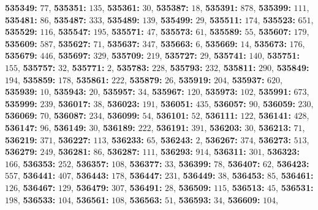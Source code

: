 \textsf{\bfseries 535349:} $77$, \textsf{\bfseries 535351:} $135$, \textsf{\bfseries 535361:} $30$, \textsf{\bfseries 535387:} $18$, \textsf{\bfseries 535391:} $878$, \textsf{\bfseries 535399:} $111$, \textsf{\bfseries 535481:} $86$, \textsf{\bfseries 535487:} $333$, \textsf{\bfseries 535489:} $139$, \textsf{\bfseries 535499:} $29$, \textsf{\bfseries 535511:} $174$, \textsf{\bfseries 535523:} $651$, \textsf{\bfseries 535529:} $116$, \textsf{\bfseries 535547:} $195$, \textsf{\bfseries 535571:} $47$, \textsf{\bfseries 535573:} $61$, \textsf{\bfseries 535589:} $55$, \textsf{\bfseries 535607:} $179$, \textsf{\bfseries 535609:} $587$, \textsf{\bfseries 535627:} $71$, \textsf{\bfseries 535637:} $347$, \textsf{\bfseries 535663:} $6$, \textsf{\bfseries 535669:} $14$, \textsf{\bfseries 535673:} $176$, \textsf{\bfseries 535679:} $446$, \textsf{\bfseries 535697:} $329$, \textsf{\bfseries 535709:} $219$, \textsf{\bfseries 535727:} $29$, \textsf{\bfseries 535741:} $140$, \textsf{\bfseries 535751:} $155$, \textsf{\bfseries 535757:} $32$, \textsf{\bfseries 535771:} $2$, \textsf{\bfseries 535783:} $228$, \textsf{\bfseries 535793:} $232$, \textsf{\bfseries 535811:} $290$, \textsf{\bfseries 535849:} $194$, \textsf{\bfseries 535859:} $178$, \textsf{\bfseries 535861:} $222$, \textsf{\bfseries 535879:} $26$, \textsf{\bfseries 535919:} $204$, \textsf{\bfseries 535937:} $620$, \textsf{\bfseries 535939:} $10$, \textsf{\bfseries 535943:} $20$, \textsf{\bfseries 535957:} $34$, \textsf{\bfseries 535967:} $120$, \textsf{\bfseries 535973:} $102$, \textsf{\bfseries 535991:} $673$, \textsf{\bfseries 535999:} $239$, \textsf{\bfseries 536017:} $38$, \textsf{\bfseries 536023:} $191$, \textsf{\bfseries 536051:} $435$, \textsf{\bfseries 536057:} $90$, \textsf{\bfseries 536059:} $230$, \textsf{\bfseries 536069:} $70$, \textsf{\bfseries 536087:} $234$, \textsf{\bfseries 536099:} $54$, \textsf{\bfseries 536101:} $52$, \textsf{\bfseries 536111:} $122$, \textsf{\bfseries 536141:} $428$, \textsf{\bfseries 536147:} $96$, \textsf{\bfseries 536149:} $30$, \textsf{\bfseries 536189:} $222$, \textsf{\bfseries 536191:} $391$, \textsf{\bfseries 536203:} $30$, \textsf{\bfseries 536213:} $71$, \textsf{\bfseries 536219:} $371$, \textsf{\bfseries 536227:} $113$, \textsf{\bfseries 536233:} $65$, \textsf{\bfseries 536243:} $2$, \textsf{\bfseries 536267:} $374$, \textsf{\bfseries 536273:} $513$, \textsf{\bfseries 536279:} $249$, \textsf{\bfseries 536281:} $86$, \textsf{\bfseries 536287:} $111$, \textsf{\bfseries 536293:} $914$, \textsf{\bfseries 536311:} $301$, \textsf{\bfseries 536323:} $166$, \textsf{\bfseries 536353:} $252$, \textsf{\bfseries 536357:} $108$, \textsf{\bfseries 536377:} $33$, \textsf{\bfseries 536399:} $78$, \textsf{\bfseries 536407:} $62$, \textsf{\bfseries 536423:} $557$, \textsf{\bfseries 536441:} $407$, \textsf{\bfseries 536443:} $178$, \textsf{\bfseries 536447:} $231$, \textsf{\bfseries 536449:} $38$, \textsf{\bfseries 536453:} $85$, \textsf{\bfseries 536461:} $126$, \textsf{\bfseries 536467:} $129$, \textsf{\bfseries 536479:} $307$, \textsf{\bfseries 536491:} $28$, \textsf{\bfseries 536509:} $115$, \textsf{\bfseries 536513:} $45$, \textsf{\bfseries 536531:} $198$, \textsf{\bfseries 536533:} $104$, \textsf{\bfseries 536561:} $108$, \textsf{\bfseries 536563:} $51$, \textsf{\bfseries 536593:} $34$, \textsf{\bfseries 536609:} $104$, 
